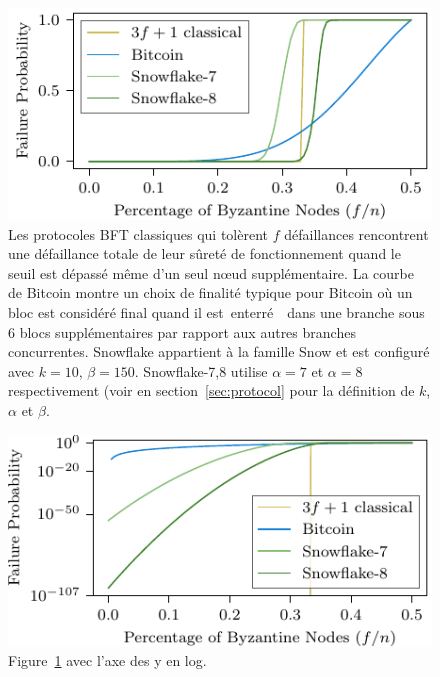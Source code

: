 \documentclass[a4,twocolumn,10pt]{article}
\newcommand{\tronly}[2]{#1}
\theoremstyle{definition}
\begin{document}
\begin{figure}[h]
    \includegraphics[width=\linewidth]{figures/safety-f-eps.pdf}
    \caption{Les protocoles BFT classiques qui tolèrent $f$ défaillances rencontrent une défaillance totale de leur sûreté de fonctionnement quand le seuil est dépassé même d'un seul nœud supplémentaire. La courbe de Bitcoin montre un choix de finalité typique pour Bitcoin où un bloc est considéré final quand il est \guillemotleft\,enterré\,\guillemotright~ dans une branche sous 6 blocs supplémentaires par rapport aux autres branches concurrentes. Snowflake appartient à la famille Snow et est configuré avec $k=10$, $\beta=150$. Snowflake-7,8 utilise $\alpha=7$ et $\alpha=8$ res\-pectivement (voir en section~\ref{sec:protocol} pour la définition de $k$, $\alpha$ et $\beta$.}
    \label{fig:fandepsilon}
\end{figure}

\tronly{%
\begin{figure}[h]
    \includegraphics[width=\linewidth]{figures/safety-f-eps-log.pdf}
    \caption{Figure~\ref{fig:fandepsilon} avec l'axe des y en log.}
    \label{fig:fandepsilonlog}
\end{figure}
}{}
\end{document}
